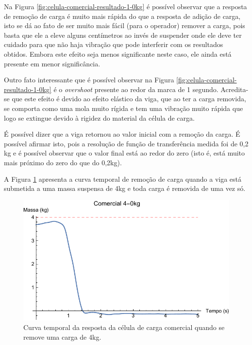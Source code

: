 \documentclass[a4paper]{instrumentacao}
\begin{document}
Na Figura \ref{fig:celula-comercial-resultado-1-0kg} é possível observar que a resposta de remoção de carga é muito mais rápida do que a resposta de adição de carga, isto se dá ao fato de ser muito mais fácil (para o operador) remover a carga, pois basta que ele a eleve alguns centímetros ao invés de suspender onde ele deve ter cuidado para que não haja vibração que pode interferir com os resultados obtidos. Embora este efeito seja menos significante neste caso, ele ainda está presente em menor significância.

Outro fato interessante que é possível observar na Figura \ref{fig:celula-comercial-resultado-1-0kg} é o \textit{overshoot} presente ao redor da marca de 1 segundo. Acredita-se que este efeito é devido ao efeito elástico da viga, que ao ter a carga removida, se comporta como uma mola muito rígida e tem uma vibração muito rápida que logo se extingue devido à rigidez do material da célula de carga.

É possível dizer que a viga retornou ao valor inicial com a remoção da carga. É possível afirmar isto, pois a resolução de função de transferência medida foi de 0,2 kg e é possível observar que o valor final está ao redor do zero (isto é, está muito mais próximo do zero do que do 0,2kg).

A Figura \ref{fig:celula-comercial-resultado-4-0kg} apresenta a curva temporal de remoção de carga quando a viga está submetida a uma massa suspensa de 4kg e toda carga é removida de uma vez só.

\begin{figure}[H]
\center
\includegraphics[width=\textwidth]{Comercial_4-0kg.pdf}
\caption{Curva temporal da resposta da célula de carga comercial quando se remove uma carga de 4kg.}
\label{fig:celula-comercial-resultado-4-0kg}
\end{figure}
\end{document}
